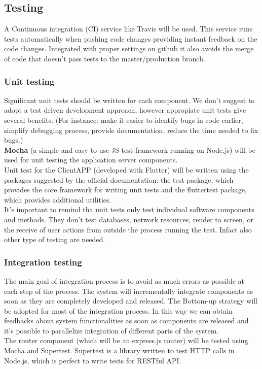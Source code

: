 \documentclass{article}
\begin{document}
\subsection{Testing}
A Continuous integration (CI) service like Travis will be used. This service runs tests automatically when pushing code changes providing instant feedback on the code changes. Integrated with proper settings on github it also avoids the merge of code that doesn't pass tests to the master/production branch.
\subsubsection{Unit testing}
Significant unit tests should be written for each component. We don't suggest to adopt a test driven development approach, however appropiate unit tests give several benefits.
(For instance: make it easier to identify bugs in code earlier, simplify debugging process, provide documentation, reduce the time needed to fix bugs.)\\
\textbf{Mocha} (a simple and easy to use JS test framework running on Node.js) will be used for unit testing the application server components.\\
Unit test for the ClientAPP  (developed with Flutter) will be written using the packages suggested by the official documentation: the test package, which provides the core framework for writing unit tests and the fluttertest package, which provides additional utilities.\\
It's important to remind tha unit tests only test individual software components and methods. They don't test databases, network resources, render to screen, or the receive of user actions from outside the process running the test.
Infact also other type of testing are needed.

\subsubsection{Integration testing}
The main goal of integration process is to avoid as much errors as possible at each step of the process. 
The system will incrementally integrate components as soon as they are completely developed and released.
The Bottom-up strategy will be adopted for most of the integration process. In this way we can obtain feedbacks about system
functionalities as soon as components are released and it's possible to parallelize integration of different parts of the system.\\
The router component (which will be an express.js router) will be tested using Mocha and Supertest. 
Supertest is a library written to test HTTP calls in Node.js, which is perfect to write tests for RESTful API.
\end{document}
